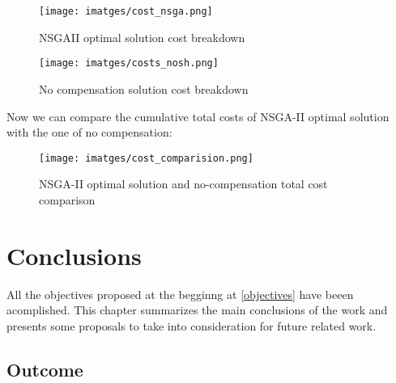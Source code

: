 \documentclass[a4paper,11pt, titlepage, twoside]{article}
\begin{document}
\begin{figure}[H]
    \centering
    \texttt{[image: imatges/cost\_nsga.png]}
    \caption{NSGAII optimal solution cost breakdown}
    \label{fig:nsgacosts}
\end{figure}

\begin{figure}[H]
    \centering
    \texttt{[image: imatges/costs\_nosh.png]}
    \caption{No compensation solution cost breakdown}
    \label{fig:noshcosts}
\end{figure}

Now we can compare the cumulative total costs of NSGA-II optimal solution with the one of no compensation:
\begin{figure}[H]
    \centering
    \texttt{[image: imatges/cost\_comparision.png]}
    \caption{NSGA-II optimal solution and no-compensation total cost comparison}
    \label{fig:noshcosts}
\end{figure}

\section{Conclusions}\label{Conclusions}

All the objectives proposed at the begginng at \ref{objectives} have beeen acomplished. This chapter summarizes
the main conclusions of the work and presents some proposals to take into consideration for future
related work.

\subsection{Outcome}
\end{document}
